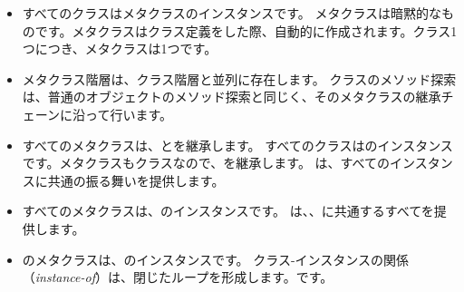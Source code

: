 \documentclass[a4paper,10pt,twoside]{book}
\begin{document}
\begin{itemize}
\item すべてのクラスはメタクラスのインスタンスです。
	メタクラスは暗黙的なものです。メタクラスはクラス定義をした際、自動的に作成されます。クラス1つにつき、メタクラスは1つです。

\item メタクラス階層は、クラス階層と並列に存在します。
	クラスのメソッド探索は、普通のオブジェクトのメソッド探索と同じく、そのメタクラスの継承チェーンに沿って行います。

\item すべてのメタクラスは、とを継承します。
	すべてのクラスはのインスタンスです。メタクラスもクラスなので、を継承します。
	は、すべてのインスタンスに共通の振る舞いを提供します。

\item すべてのメタクラスは、のインスタンスです。
	は、、に共通するすべてを提供します。

\item {}のメタクラスは、のインスタンスです。
	クラス-インスタンスの関係（\emph{instance-of}）は、閉じたループを形成します。です。
\end{itemize}
\ifx\wholebook\relax\else
\end{document}
